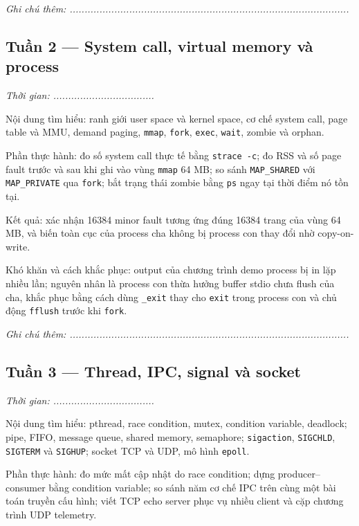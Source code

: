 \documentclass[11pt]{article}
\newcommand{\code}[1]{\texttt{#1}}
\begin{document}
\vspace{0.4cm}
\textit{Ghi chú thêm: ..............................................................................................}
\vspace{0.6cm}

\subsection*{Tuần 2 --- System call, virtual memory và process}

\textit{Thời gian: ..................................}

Nội dung tìm hiểu: ranh giới user space và kernel space, cơ chế system call, page table và MMU, demand paging, \code{mmap}, \code{fork}, \code{exec}, \code{wait}, zombie và orphan.

Phần thực hành: đo số system call thực tế bằng \code{strace -c}; đo RSS và số page fault trước và sau khi ghi vào vùng \code{mmap} 64 MB; so sánh \code{MAP\_SHARED} với \code{MAP\_PRIVATE} qua \code{fork}; bắt trạng thái zombie bằng \code{ps} ngay tại thời điểm nó tồn tại.

Kết quả: xác nhận 16384 minor fault tương ứng đúng 16384 trang của vùng 64 MB, và biến toàn cục của process cha không bị process con thay đổi nhờ copy-on-write.

Khó khăn và cách khắc phục: output của chương trình demo process bị in lặp nhiều lần; nguyên nhân là process con thừa hưởng buffer stdio chưa flush của cha, khắc phục bằng cách dùng \code{\_exit} thay cho \code{exit} trong process con và chủ động \code{fflush} trước khi \code{fork}.

\vspace{0.4cm}
\textit{Ghi chú thêm: ..............................................................................................}
\vspace{0.6cm}

\subsection*{Tuần 3 --- Thread, IPC, signal và socket}

\textit{Thời gian: ..................................}

Nội dung tìm hiểu: pthread, race condition, mutex, condition variable, deadlock; pipe, FIFO, message queue, shared memory, semaphore; \code{sigaction}, \code{SIGCHLD}, \code{SIGTERM} và \code{SIGHUP}; socket TCP và UDP, mô hình \code{epoll}.

Phần thực hành: đo mức mất cập nhật do race condition; dựng producer--consumer bằng condition variable; so sánh năm cơ chế IPC trên cùng một bài toán truyền cấu hình; viết TCP echo server phục vụ nhiều client và cặp chương trình UDP telemetry.
\end{document}
